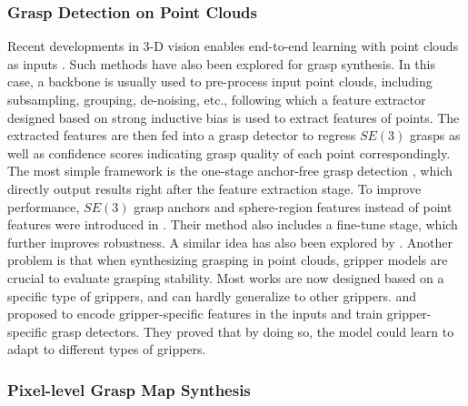\documentclass[letterpaper,10pt]{article}
\newcommand{\sethree}{SE(3)}
\begin{document}

\subsubsection{Grasp Detection on Point Clouds}

Recent developments in 3-D vision enables end-to-end learning with point clouds as inputs \cite{qi2017pointnet, qi2017pointnet++, li2018pointcnn, zhou2018voxelnet, zhao2021point, mazur2021cloud}.
Such methods have also been explored for grasp synthesis.
In this case, a backbone is usually used to pre-process input point clouds, including subsampling, grouping, de-noising, etc., following which a feature extractor designed based on strong inductive bias is used to extract features of points.
The extracted features are then fed into a grasp detector to regress $\sethree$ grasps as well as confidence scores indicating grasp quality of each point correspondingly.
The most simple framework is the one-stage anchor-free grasp detection \cite{qin2020s4g, ni2020pointnet++, sundermeyer2021contact}, which directly output results right after the feature extraction stage.
To improve performance, $\sethree$ grasp anchors and sphere-region features instead of point features were introduced in \cite{zhao2021regnet}.
Their method also includes a fine-tune stage, which further improves robustness.
A similar idea has also been explored by \cite{wu2020grasp, wei2021gpr}.
Another problem is that when synthesizing grasping in point clouds, gripper models are crucial to evaluate grasping stability.
Most works are now designed based on a specific type of grippers, and can hardly generalize to other grippers.
\cite{shao2020unigrasp} and \cite{xu2021adagrasp} proposed to encode gripper-specific features in the inputs and train gripper-specific grasp detectors.
They proved that by doing so, the model could learn to adapt to different types of grippers.


\subsubsection{Pixel-level Grasp Map Synthesis}
\label{sec:pixel-grasp}
\end{document}
